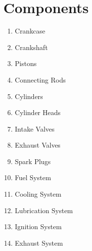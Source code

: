 \section{Components}

\begin{enumerate}
	\item Crankcase
	\item Crankshaft
	\item Pistons
	\item Connecting Rods
	\item Cylinders
	\item Cylinder Heads
	\item Intake Valves
	\item Exhaust Valves
	\item Spark Plugs
	\item Fuel System
	\item Cooling System
	\item Lubrication System
	\item Ignition System
	\item Exhaust System
\end{enumerate}
